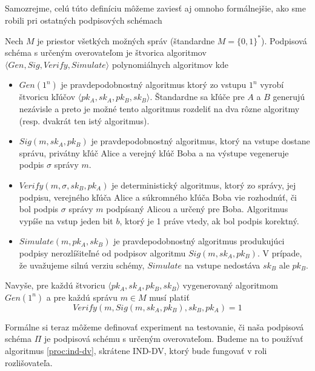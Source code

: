 Samozrejme, celú túto definíciu môžeme zaviesť aj omnoho formálnejšie,
ako sme robili pri ostatných podpisových schémach

\begin{definicia}
    Nech $M$ je priestor všetkých možných správ (štandardne
    $M=\{0,1\}^*$). Podpisová schéma s určeným overovateľom je
    štvorica algoritmov
    $\langle Gen, Sig, Verify, Simulate \rangle$ polynomiálnych
    algoritmov kde
    \begin{itemize}
        \item $Gen(1^n)$ je pravdepodobnostný algoritmus ktorý zo
            vstupu $1^n$ vyrobí štvoricu kľúčov
            $\langle pk_A,sk_A,pk_B,sk_B \rangle$.
            Štandardne sa kľúče pre $A$ a $B$ generujú nezávisle a
            preto je možné tento algoritmus rozdeliť na dva rôzne
            algoritmy (resp. dvakrát ten istý algoritmus).

        \item $Sig(m,sk_A,pk_B)$ je pravdepodobnostný algoritmus,
            ktorý na vstupe dostane správu, privátny kľúč Alice a
            verejný kľúč Boba a na výstupe vegeneruje podpis $\sigma$
            správy $m$.

        \item $Verify(m,\sigma,sk_B,pk_A)$ je deterministický
            algoritmus, ktorý zo správy, jej podpisu, verejného kľúča
            Alice a súkromného kľúča Boba vie rozhodnúť, či bol podpis
            $\sigma$ správy $m$ podpísaný Alicou a určený pre Boba.
            Algoritmus vypíše na vstup jeden bit $b$, ktorý je 1 práve
            vtedy, ak bol podpis korektný.

        \item $Simulate(m,pk_A,sk_B)$ je pravdepodobnostný algoritmus
            produkujúci podpisy nerozlíšiteľné od podpisov algoritmu
            $Sig(m,sk_A,pk_B)$.
            V prípade, že uvažujeme silnú verziu schémy, $Simulate$ na
            vstupe nedostáva $sk_B$ ale $pk_B$.
    \end{itemize}
    Navyše, pre každú štvoricu $\langle pk_A,sk_A,pk_B,sk_B \rangle$
    vygenerovaný algoritmom $Gen(1^n)$ a pre každú správu $m\in M$
    musí platiť
    \begin{equation*}
        Verify(m, Sig(m,sk_A,pk_B),sk_B,pk_A)=1
    \end{equation*}
\end{definicia}

Formálne si teraz môžeme definovať experiment na testovanie, či naša
podpisová schéma $\Pi$ je podpisová schému s určeným overovateľom.
Budeme na to používať algoritmus
\ref{proc:ind-dv}, skrátene IND-DV, ktorý bude fungovať v roli
rozlišovateľa.

